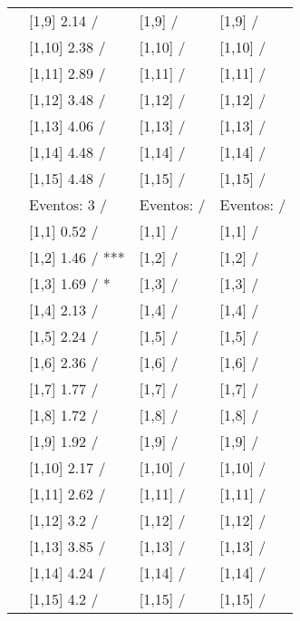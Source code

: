 \begin{table}
\begin{tabular}[t]{llll}
\addlinespace
 & {}[1,9] 2.14  / & {}[1,9]  / & {}[1,9]  /\\
 & {}[1,10] 2.38  / & {}[1,10]  / & {}[1,10]  /\\
 & {}[1,11] 2.89  / & {}[1,11]  / & {}[1,11]  /\\
 & {}[1,12] 3.48  / & {}[1,12]  / & {}[1,12]  /\\
 & {}[1,13] 4.06  / & {}[1,13]  / & {}[1,13]  /\\
\addlinespace
 & {}[1,14] 4.48  / & {}[1,14]  / & {}[1,14]  /\\
 & {}[1,15] 4.48  / & {}[1,15]  / & {}[1,15]  /\\
 & Eventos:  3 / & Eventos:   / & Eventos:   /\\
 & {}[1,1] 0.52  / & {}[1,1]  / & {}[1,1]  /\\
 & {}[1,2] 1.46  / *** & {}[1,2]  / & {}[1,2]  /\\
\addlinespace
 & {}[1,3] 1.69  / * & {}[1,3]  / & {}[1,3]  /\\
 & {}[1,4] 2.13  / & {}[1,4]  / & {}[1,4]  /\\
 & {}[1,5] 2.24  / & {}[1,5]  / & {}[1,5]  /\\
 & {}[1,6] 2.36  / & {}[1,6]  / & {}[1,6]  /\\
 & {}[1,7] 1.77  / & {}[1,7]  / & {}[1,7]  /\\
\addlinespace
500 & {}[1,8] 1.72  / & {}[1,8]  / & {}[1,8]  /\\
 & {}[1,9] 1.92  / & {}[1,9]  / & {}[1,9]  /\\
 & {}[1,10] 2.17  / & {}[1,10]  / & {}[1,10]  /\\
 & {}[1,11] 2.62  / & {}[1,11]  / & {}[1,11]  /\\
 & {}[1,12] 3.2  / & {}[1,12]  / & {}[1,12]  /\\
\addlinespace
 & {}[1,13] 3.85  / & {}[1,13]  / & {}[1,13]  /\\
 & {}[1,14] 4.24  / & {}[1,14]  / & {}[1,14]  /\\
 & {}[1,15] 4.2  / & {}[1,15]  / & {}[1,15]  /\\
\bottomrule
\end{tabular}
\end{table}
